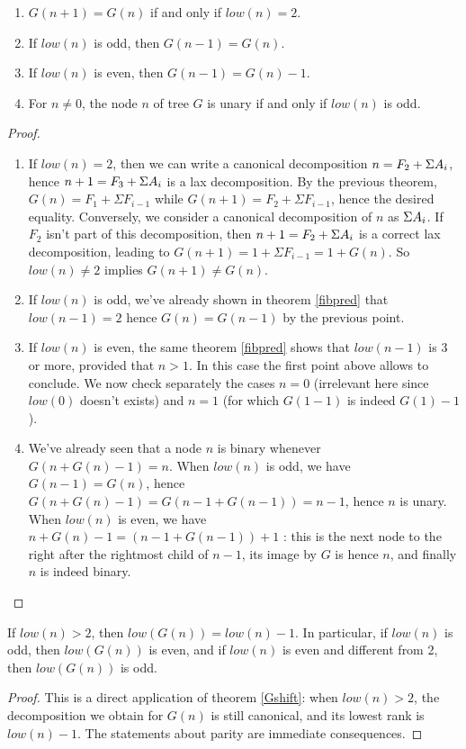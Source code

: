 \documentclass[a4paper,11pt]{article}
\begin{document}
\begin{theorem}\label{Gclass1}
\noindent
\begin{enumerate}
\item $G(n+1)=G(n)$ if and only if $low(n)=2$.
\item If $low(n)$ is odd, then $G(n-1)=G(n)$.
\item If $low(n)$ is even, then $G(n-1)=G(n)-1$.
\item For $n\neq 0$, the node $n$ of tree $G$
 is unary if and only if $low(n)$ is odd.
\end{enumerate}
\end{theorem}
\begin{proof}
\noindent
\begin{enumerate}
\item
If $low(n)=2$, then we can write a canonical decomposition
$n=F_2+\Sigma A_i$, hence
$n+1=F_3+\Sigma A_i$ is a lax decomposition. By the previous
theorem, $G(n) = F_1 + \Sigma F_{i-1}$ while
$G(n+1) = F_2 + \Sigma F_{i-1}$, hence the desired equality.
Conversely, we consider a canonical decomposition of $n$ as $\Sigma A_i$.
If $F_2$ isn't part of this decomposition, then $n+1=F_2+\Sigma A_i$
is a correct lax decomposition, leading to
$G(n+1)=1+\Sigma F_{i-1}=1+G(n)$. So $low(n)\neq 2$ implies
$G(n+1)\neq G(n)$.

\item If $low(n)$ is odd, we've already shown in theorem \ref{fibpred}
  that $low(n-1)=2$ hence $G(n)=G(n-1)$ by the previous point.

\item If $low(n)$ is even, the same theorem
 \ref{fibpred} shows that $low(n-1)$ is 3 or more, provided that $n>1$.
 In this case the first point above allows to conclude. We now check separately
 the cases $n=0$ (irrelevant here since $low(0)$ doesn't exists) and
 $n=1$ (for which $G(1-1)$ is indeed $G(1)-1$).

\item We've already seen that a node $n$ is binary whenever 
$G(n+G(n)-1) = n$. When $low(n)$ is odd, we have
$G(n-1)=G(n)$, hence $G(n+G(n)-1) = G(n-1+G(n-1)) = n-1$, hence $n$ is
  unary. When $low(n)$ is even, we have
$n+G(n)-1 = (n-1+G(n-1))+1$ : this is the next node to the right after
the rightmost child of $n-1$, its image by $G$ is hence $n$, and
finally $n$ is indeed binary.
\end{enumerate}
\end{proof}


\begin{theorem}\label{Glow}
If $low(n)>2$, then $low(G(n))=low(n)-1$. In particular,
if $low(n)$ is odd, then $low(G(n))$ is even, and if $low(n)$
is even and different from 2, then $low(G(n))$ is odd.
\end{theorem}
\begin{proof}
This is a direct application of theorem \ref{Gshift}:
when $low(n)>2$, the decomposition we obtain for $G(n)$ is
still canonical, and its lowest rank is $low(n)-1$.
The statements about parity are immediate consequences.
\end{proof}
\end{document}
